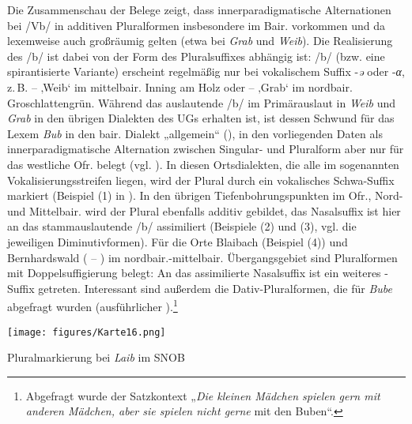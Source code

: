 Die Zusammenschau der Belege zeigt, dass innerparadigmatische Alternationen bei /Vb/ in additiven Pluralformen insbesondere im Bair. vorkommen und da lexemweise auch großräumig gelten (etwa bei \textit{Grab} und \textit{Weib}). Die Realisierung des /b/ ist dabei von der Form des Pluralsuffixes abhängig ist: /b/ (bzw. eine spirantisierte Variante) erscheint regelmäßig nur bei vokalischem Suffix -\textit{ə} oder -\textit{α}, z.\,B.  --  ‚Weib‘ im mittelbair. Inning am Holz oder  --  ‚Grab‘ im nordbair. Groschlattengrün. Während das auslautende /b/ im Primärauslaut in \textit{Weib} und \textit{Grab} in den übrigen Dialekten des UGs erhalten ist, ist dessen Schwund für das Lexem \textit{Bub} in den bair. Dialekt „allgemein“ (\citealt[§30b3]{Kranzmayer1956}), in den vorliegenden Daten als innerparadigmatische Alternation zwischen Singular- und Pluralform aber nur für das westliche Ofr. belegt (vgl. \citealt[§51]{Frommann1857}). In diesen Ortsdialekten, die alle im sogenannten Vokalisierungsstreifen liegen, wird der Plural durch ein vokalisches Schwa-Suffix markiert (Beispiel (1) in 	). In den übrigen Tiefenbohrungspunkten im Ofr., Nord- und Mittelbair. wird der Plural ebenfalls additiv gebildet, das Nasalsuffix ist hier an das stammauslautende /b/ assimiliert (Beispiele (2) und (3), vgl. die jeweiligen Diminutivformen). Für die Orte Blaibach (Beispiel (4)) und Bernhardswald ( -- ) im nordbair.-mittelbair. Übergangsgebiet sind Pluralformen mit Doppelsuffigierung belegt: An das assimilierte Nasalsuffix ist ein weiteres -Suffix getreten. Interessant sind außerdem die Dativ-Pluralformen, die für \textit{Bube} abgefragt wurden (ausführlicher ).\footnote{Abgefragt wurde der Satzkontext „\textit{Die kleinen Mädchen spielen gern mit anderen Mädchen, aber sie spielen nicht gerne} mit den Buben“.}


\begin{map}
\texttt{[image: figures/Karte16.png]}
\caption{Pluralmarkierung bei \textit{Laib} im SNOB}
\label{map:16}
\end{map}

